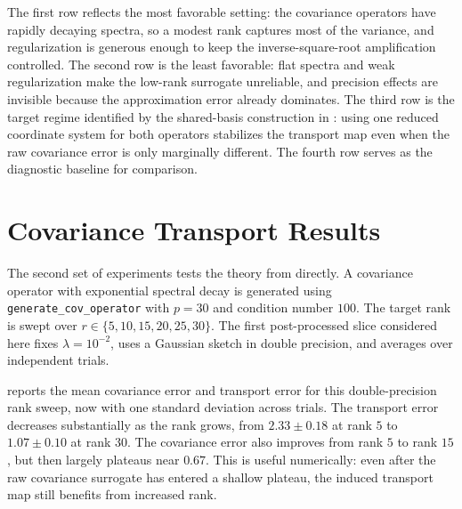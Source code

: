 The first row reflects the most favorable setting: the covariance operators have
rapidly decaying spectra, so a modest rank captures most of the variance, and
regularization is generous enough to keep the inverse-square-root amplification
controlled.  The second row is the least favorable: flat spectra and weak
regularization make the low-rank surrogate unreliable, and precision effects
are invisible because the approximation error already dominates.  The third row
is the target regime identified by the shared-basis construction in
: using one reduced coordinate system for both
operators stabilizes the transport map even when the raw covariance error is
only marginally different.  The fourth row serves as the diagnostic baseline
for comparison.

\section{Covariance Transport Results}

The second set of experiments tests the theory from  directly. A covariance operator with exponential spectral decay is generated using \texttt{generate\_cov\_operator} with \(p=30\) and condition number \(100\). The target rank is swept over \(r \in \{5,10,15,20,25,30\}\). The first post-processed slice considered here fixes \(\lambda = 10^{-2}\), uses a Gaussian sketch in double precision, and averages over independent trials.

 reports the mean covariance error and transport error for this double-precision rank sweep, now with one standard deviation across trials. The transport error decreases substantially as the rank grows, from \(2.33 \pm 0.18\) at rank \(5\) to \(1.07 \pm 0.10\) at rank \(30\). The covariance error also improves from rank \(5\) to rank \(15\), but then largely plateaus near \(0.67\). This is useful numerically: even after the raw covariance surrogate has entered a shallow plateau, the induced transport map still benefits from increased rank.

